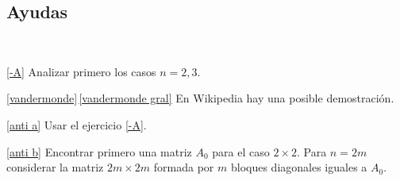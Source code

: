 \subsection*{Ayudas}

\

\ref{-A} Analizar primero los casos $n=2,3$.


\ref{vandermonde}\,\ref{vandermonde gral} En Wikipedia hay una posible demostración.


\ref{anti a} Usar el ejercicio \ref{-A}.


\ref{anti b} Encontrar primero una matriz $A_0$ para el caso $2\times 2$. Para $n = 2m$ considerar la matriz $2m \times 2m$ formada por $m$ bloques diagonales iguales a $A_0$.

